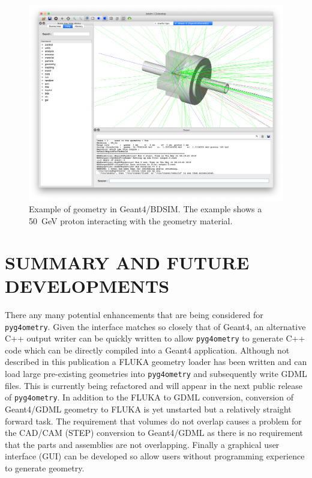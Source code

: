 \documentclass[a4paper,
               keeplastbox,   %
               ]{jacow}
\begin{document}
\begin{figure}[h!tb]
   \centering
   \includegraphics*[width=1.0\columnwidth]{./examples/dipole_bdsim.jpg}
   \caption{Example of geometry in Geant4/BDSIM. The example shows a 50~GeV proton interacting with the geometry material.}
   \label{fig:dipole}
\end{figure}

\section{SUMMARY AND FUTURE DEVELOPMENTS}
There any many potential enhancements that are being considered for \verb|pyg4ometry|. Given the interface matches so closely that of Geant4, 
an alternative C++ output writer can be quickly written to allow \verb|pyg4ometry| to generate C++ code which can be directly compiled into a 
Geant4 application. Although not described in this publication a FLUKA geometry loader has been written and can load large pre-existing geometries into 
\verb|pyg4ometry| and subsequently write GDML files. This is currently being refactored and will appear in the next public release of \verb|pyg4ometry|.
In addition to the FLUKA to GDML conversion, conversion of Geant4/GDML geometry to FLUKA is yet unstarted but a relatively straight forward
task. The requirement that volumes do not overlap causes a problem for the CAD/CAM (STEP) conversion to Geant4/GDML as there is no requirement 
that the parts and assemblies are not overlapping. Finally a graphical user interface (GUI) can be developed so allow users without programming 
experience to generate geometry.
\end{document}

